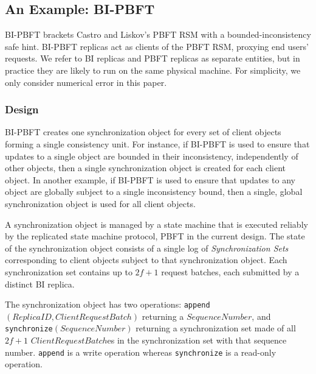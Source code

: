 \documentclass[twocolumn,10pt]{article}
\newcommand{\stitle}[1]{\vspace{2pt}{\bf #1:}}
\newcommand{\method}[1]{{\texttt{\small #1}}}
\begin{document}
\subsection{An Example: BI-PBFT}
\label{sec:bipbft}

BI-PBFT brackets Castro and Liskov's PBFT RSM with a
bounded-inconsistency safe hint. BI-PBFT replicas act as clients of the
PBFT RSM, proxying end users' requests. We refer to BI replicas and PBFT
replicas as separate entities, but in practice they are likely to run on
the same physical machine.  For simplicity, we only consider numerical
error in this paper.

\subsubsection{Design}

\stitle{The Synchronization Object State Machine} BI-PBFT creates one
synchronization object for every set of client objects forming a single
consistency unit.  For instance, if BI-PBFT is used to ensure that
updates to a single object are bounded in their inconsistency,
independently of other objects, then a single synchronization object is
created for each client object.  In another example, if BI-PBFT is used
to ensure that updates to any object are globally subject to a single
inconsistency bound, then a single, global synchronization object is
used for all client objects.

A synchronization object is managed by a state machine that is executed
reliably by the replicated state machine protocol, PBFT in the current
design.  The state of the synchronization object consists of a single
log of \emph{Synchronization Sets} corresponding to client objects
subject to that synchronization object.  Each synchronization set
contains up to $2f+1$ request batches, each submitted by a distinct BI
replica.

The synchronization object has two operations:
\method{append}$(\mathit{ReplicaID}, \mathit{ClientRequestBatch})$
returning a $\mathit{SequenceNumber}$, and
\method{synchronize}$(\mathit{SequenceNumber})$ returning a
synchronization set made of all $2f+1$
$\mathit{ClientRequestBatch}$es in the synchronization set with that
sequence number.  \method{append} is a write operation whereas
\method{synchronize} is a read-only operation.
\end{document}
